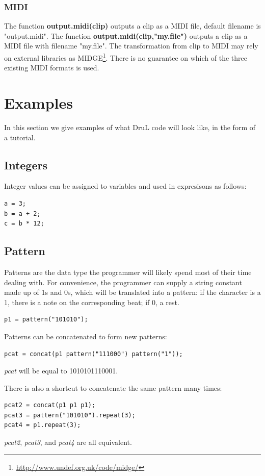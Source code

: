 \documentclass[11pt,twoside]{article}
\begin{document}
\subsubsection{MIDI}
The function \textbf{output.midi(clip)} outputs a clip as a MIDI file,
default filename is "output.midi". 
The function \textbf{output.midi(clip,"my.file")} outputs a clip as a MIDI
file with filename "my.file". The transformation from clip to MIDI may rely
on external libraries as MIDGE\footnote{\url{http://www.undef.org.uk/code/midge/}}. There is no guarantee on which of the three existing MIDI formats is used.


\section{Examples}
In this section we give examples of what DruL code will look like, in the form
of a tutorial.

\subsection{Integers}

Integer values can be assigned to variables and used in expresisons as follows:

\begin{verbatim}
a = 3;
b = a + 2;
c = b * 12;
\end{verbatim}

\subsection{Pattern}
Patterns are the data type the programmer will likely spend most of their time dealing with.  For convenience, the programmer can supply a string constant made up of 1s and 0s, which will be translated into a pattern: if the character is a 1, there is a note on the corresponding beat; if 0, a rest.
\begin{verbatim}
p1 = pattern("101010");
\end{verbatim}
Patterns can be concatenated to form new patterns:
\begin{verbatim}
pcat = concat(p1 pattern("111000") pattern("1"));
\end{verbatim}
\textit{pcat} will be equal to 1010101110001.

There is also a shortcut to concatenate the same pattern many times:
\begin{verbatim}
pcat2 = concat(p1 p1 p1);
pcat3 = pattern("101010").repeat(3);
pcat4 = p1.repeat(3);
\end{verbatim}
\textit{pcat2}, \textit{pcat3}, and \textit{pcat4} are all equivalent.
\end{document}
